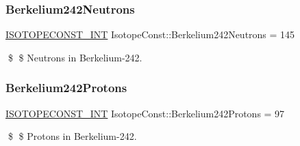 \subsubsection{\texorpdfstring{Berkelium242\+Neutrons}{Berkelium242Neutrons}}
{\footnotesize\ttfamily \mbox{\hyperlink{group___isotope_const-_macros_ga5f18360b3e99483a35c32d789e62621c}{I\+S\+O\+T\+O\+P\+E\+C\+O\+N\+S\+T\+\_\+\+I\+NT}} Isotope\+Const\+::\+Berkelium242\+Neutrons = 145}

\$ \$ Neutrons in Berkelium-\/242. \mbox{\label{group___isotope_const-_berkelium-_bk242_gaeb9d5a4bf9baa0ccb4fe33913ea65580}} 
\subsubsection{\texorpdfstring{Berkelium242\+Protons}{Berkelium242Protons}}
{\footnotesize\ttfamily \mbox{\hyperlink{group___isotope_const-_macros_ga5f18360b3e99483a35c32d789e62621c}{I\+S\+O\+T\+O\+P\+E\+C\+O\+N\+S\+T\+\_\+\+I\+NT}} Isotope\+Const\+::\+Berkelium242\+Protons = 97}

\$ \$ Protons in Berkelium-\/242. 